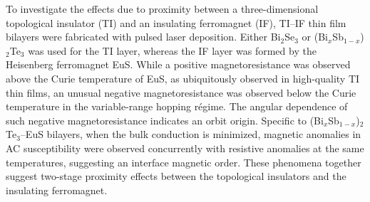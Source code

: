 To investigate the effects due to proximity between a three-dimensional topological insulator (TI) and an insulating ferromagnet (IF), TI--IF thin film bilayers were fabricated with pulsed laser deposition. Either Bi$_2$Se$_3$ or (Bi$_x$Sb$_{1-x}$)$_2$Te$_3$ was used for the TI layer, whereas the IF layer was formed by the Heisenberg ferromagnet EuS. While a positive magnetoresistance was observed above the Curie temperature of EuS, as ubiquitously observed in high-quality TI thin films, an unusual negative magnetoresistance was observed below the Curie temperature in the variable-range hopping r\'egime. The angular dependence of such negative magnetoresistance indicates an orbit origin. Specific to (Bi$_x$Sb$_{1-x}$)$_2$Te$_3$--EuS bilayers, when the bulk conduction is minimized, magnetic anomalies in AC susceptibility were observed concurrently with resistive anomalies at the same temperatures, suggesting an interface magnetic order. These phenomena together suggest two-stage proximity effects between the topological insulators and the insulating ferromagnet.